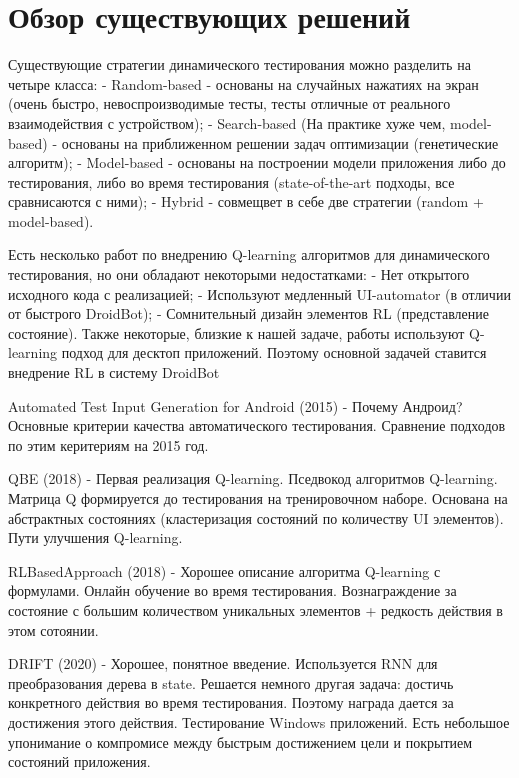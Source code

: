 \section{Обзор существующих решений}
\label{sec:Chapter2} 

Существующие стратегии динамического тестирования можно разделить на четыре класса:
- Random-based - основаны на случайных нажатиях на экран (очень быстро, невоспроизводимые тесты, тесты отличные от реального взаимодействия с устройством);
- Search-based (На практике хуже чем, model-based) - основаны на приближенном решении задач оптимизации (генетические алгоритм);
- Model-based - основаны на построении модели приложения либо до тестирования, либо во время тестирования (state-of-the-art подходы, все сравнисаются с ними);
- Hybrid - совмещвет в себе две стратегии (random + model-based).

Есть несколько работ по внедрению Q-learning алгоритмов для динамического тестирования, но они обладают некоторыми недостатками:
- Нет открытого исходного кода с реализацией;
- Используют медленный UI-automator (в отличии от быстрого DroidBot);
- Сомнительный дизайн элементов RL (представление состояние).
Также некоторые, близкие к нашей задаче, работы используют Q-learning подход для десктоп приложений. Поэтому основной задачей ставится внедрение RL в систему DroidBot

Automated Test Input Generation for Android (2015) - Почему Андроид? Основные критерии качества автоматического тестирования. Сравнение подходов по этим керитериям на 2015 год.

QBE (2018) - Первая реализация Q-learning. Пседвокод алгоритмов Q-learning. Матрица Q формируется до тестирования на тренировочном наборе. Основана на абстрактных состояниях (кластеризация состояний по количеству UI элементов). Пути улучшения Q-learning.

RLBasedApproach (2018) - Хорошее описание алгоритма Q-learning с формулами. Онлайн обучение во время тестирования. Вознаграждение за состояние с большим количеством уникальных элементов + редкость действия в этом сотоянии.

DRIFT (2020) - Хорошее, понятное введение. Используется RNN для преобразования дерева в state. Решается немного другая задача: достичь конкретного действия во время тестирования. Поэтому награда дается за достижения этого действия. Тестирование Windows приложений. Есть небольшое упонимание о компромисе между быстрым достижением цели и покрытием состояний приложения.

